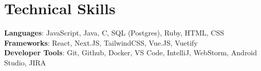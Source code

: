 \documentclass[letterpaper,11pt]{article}
\begin{document}
%
\section{Technical Skills}
 \begin{itemize}[leftmargin=0.15in, label={}]
    \small{\item{
     \textbf{Languages}{: JavaScript, Java, C, SQL (Postgres), Ruby, HTML, CSS} \\
     \textbf{Frameworks}{: React, Next.JS, TailwindCSS, Vue.JS, Vuetify} \\
     \textbf{Developer Tools}{: Git, Github, Docker, VS Code, IntelliJ, WebStorm, Android Studio, JIRA}
    }}
 \end{itemize}


\end{document}
